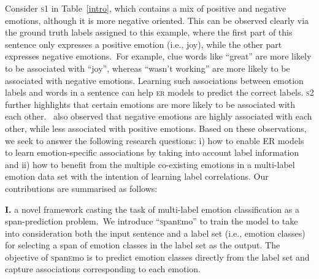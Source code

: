 \documentclass[11pt,a4paper]{article}
\begin{document}
\begin{table}[htbp]
  \centering
    \caption{Example Tweets from SemEval-18 Task 1. GT represents the ground truth labels.}
  \label{intro}\end{table}

Consider \textsc{s}1 in Table~\ref{intro}, which contains a mix of positive and negative emotions, although it is more negative oriented. This can be observed clearly via the ground truth labels assigned to this example, where the first part of this sentence only expresses a positive emotion (i.e., joy), while the other part expresses negative emotions.~For example, clue words like ``great'' are more likely to be associated with ``joy'', whereas ``wasn't working'' are more likely to be associated with negative emotions. Learning such associations between emotion labels and words in a sentence can help \textsc{er} models to predict the correct labels. \textsc{s}2 further highlights that certain emotions are more likely to be associated with each other.~ also observed that negative emotions are highly associated with each other, while less associated with positive emotions. Based on these observations, we seek to answer the following research questions: i) how to enable ER models to learn emotion-specific associations by taking into account label information and ii) how to benefit from the multiple co-existing emotions in a multi-label emotion data set with the intention of learning label correlations. Our contributions are summarised as follows:




\noindent
\textbf{I.} a novel framework casting the task of multi-label emotion classification as a span-prediction problem.~We introduce ``\textsc{s}pan\textsc{e}mo'' to train the model to take into consideration both the input sentence and a label set (i.e., emotion classes) for selecting a span of emotion classes in the label set as the output. The objective of \textsc{s}pan\textsc{e}mo is to predict emotion classes directly from the label set and capture associations corresponding to each emotion. 
\end{document}
